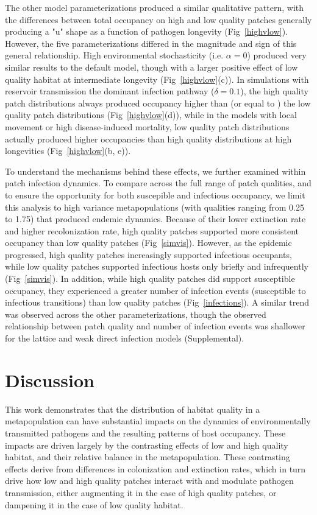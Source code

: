 \documentclass{article}
\begin{document}
The other model parameterizations produced a similar qualitative pattern, with the differences between total occupancy on high and low quality patches generally producing a "u" shape as a function of pathogen longevity (Fig~\ref{highvlow}).  However, the five parameterizations differed in the magnitude and sign of this general relationship.  High environmental stochasticity (i.e. $\alpha = 0$) produced very similar results to the default model, though with a larger positive effect of low quality habitat at intermediate longevity (Fig~\ref{highvlow}(c)).  In simulations with reservoir transmission the dominant infection pathway ($\delta = 0.1$), the high quality patch distributions always produced occupancy higher than (or equal to ) the low quality patch distributions (Fig~\ref{highvlow}(d)), while in the models with local movement or high disease-induced mortality, low quality patch distributions actually produced higher occupancies than high quality distributions at high longevities (Fig~\ref{highvlow}(b, e)).

To understand the mechanisms behind these effects, we further examined within patch infection dynamics.  To compare across the full range of patch qualities, and to ensure the opportunity for both suscepible and infectious occupancy, we limit this analysis to high variance metapopulations (with qualities ranging from 0.25 to 1.75) that produced endemic dynamics.  Because of their lower extinction rate and higher recolonization rate, high quality patches supported more consistent occupancy than low quality patches (Fig~\ref{simvis}).  However, as the epidemic progressed, high quality patches increasingly supported infectious occupants, while low quality patches supported infectious hosts only briefly and infrequently (Fig~\ref{simvis}).  In addition, while high quality patches did support susceptible occupancy, they experienced a greater number of infection events (susceptible to infectious transitions) than low quality patches (Fig~\ref{infections}).  A similar trend was observed across the other parameterizations, though the observed relationship between patch quality and number of infection events was shallower for the lattice and weak direct infection models (Supplemental).


\section{Discussion}
\label{discussion} 

This work demonstrates that the distribution of habitat quality in a metapopulation can have substantial impacts on the dynamics of environmentally transmitted pathogens and the resulting patterns of host occupancy.  These impacts are driven largely by the contrasting effects of low and high quality habitat, and their relative balance in the metapopulation.  These contrasting effects derive from differences in colonization and extinction rates, which in turn drive how low and high quality patches interact with and modulate pathogen transmission, either augmenting it in the case of high quality patches, or dampening it in the case of low quality habitat.   
\end{document}
